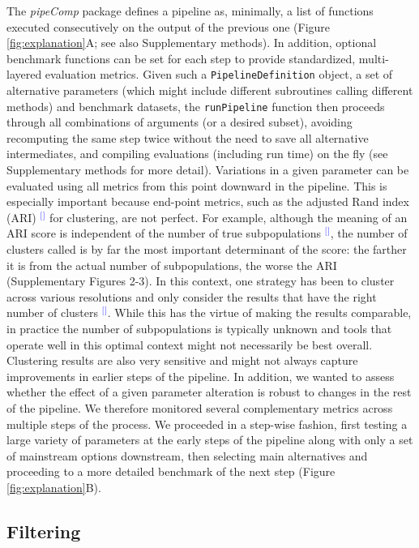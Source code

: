 \documentclass[11pt]{article}
\renewcommand{\cite}[1]{\textcolor{Blue}{$^[$\supercite{#1}$^]$}}
\begin{document}
The \textit{pipeComp} package defines a pipeline as, minimally, a list of functions executed consecutively on the output of the previous one {\color{red}(Figure \ref{fig:explanation}A; see also Supplementary methods). In addition, optional benchmark functions can be set for each step to provide standardized, multi-layered evaluation metrics. Given such a \texttt{PipelineDefinition} object, a set of alternative parameters (which might include different subroutines calling different methods) and benchmark datasets, the \texttt{runPipeline} function then proceeds through all combinations of arguments (or a desired subset), avoiding recomputing the same step twice without the need to save all alternative intermediates, and compiling evaluations (including run time) on the fly (see Supplementary methods for more detail).} Variations in a given parameter can be evaluated using all metrics from this point downward in the pipeline. This is especially important because end-point metrics, such as the adjusted Rand index (ARI) \cite{HubertARI1985} for clustering, are not perfect. For example, although the meaning of an ARI score is independent of the number of true subpopulations \cite{steinleyProperties2004}, the number of clusters called is by far the most important determinant of the score: the farther it is from the actual number of subpopulations, the worse the ARI (Supplementary Figures 2-3). In this context, one strategy has been to cluster across various resolutions and only consider the results that have the right number of clusters \cite{duoClustering2018}. While this has the virtue of making the results comparable, in practice the number of subpopulations is typically unknown and tools that operate well in this optimal context might not necessarily be best overall. Clustering results are also very sensitive and might not always capture improvements in earlier steps of the pipeline. In addition, we wanted to assess whether the effect of a given parameter alteration is robust to changes in the rest of the pipeline. We therefore monitored several complementary metrics across multiple steps of the process. We proceeded in a step-wise fashion, first testing a large variety of parameters at the early steps of the pipeline along with only a set of mainstream options downstream, then selecting main alternatives and proceeding to a more detailed benchmark of the next step (Figure \ref{fig:explanation}B).

\subsection*{Filtering}
\end{document}
